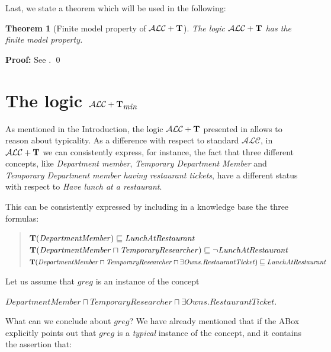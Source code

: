 \documentclass[a4paper, 11pt, oneside]{duthesis}
\newcommand{\tip}{{\bf T}}
\newcommand{\alc}{\mathcal{ALC}}
\newcommand{\alct}{\mathcal{ALC}+\tip}
\newcommand{\alctmin}{\mathcal{ALC}+\tip_{\mbox{\em min}}}
\newcommand{\nott} {\lnot}
\newcommand{\sqset}{\sqsubseteq}
\newcommand{\mint}{\sqcap}
\newenvironment{proof}
{\begin{trivlist} \item[] {\bf Proof:}}%
{\qed \end{trivlist}}
\newenvironment{proof}
{\begin{trivlist} \item[] {\bf Proof:}}%
{\qed \end{trivlist}}
\newtheorem{theorem}{Theorem}
\newcounter{posu}
\newtheorem{theorem}[posu]{Theorem}
\newtheorem{proof}[posu]{Proof}
\begin{document}
Last, we state a theorem which will be used in the following:

\begin{theorem}[Finite model property of $\alct$]\label{fmpALCT}
The logic $\alct$ has the finite model property.
\end{theorem}

\begin{proof}
See \cite{Giordano:2013:NDL:2435476.2435957}.
\end{proof}

\newpage

\section{The logic $\alctmin$}\label{alctmin}

As mentioned in the Introduction, the logic $\alct$ presented in \cite{FI09} allows  to reason about typicality.
As a difference with respect to standard $\alc$, in $\alct$ we can consistently express, for instance, the fact that three different concepts, like {\em Department member}, {\em Temporary Department Member} and {\em Temporary Department member having restaurant tickets}, have a different status with respect to {\em Have lunch at a restaurant}.

This can be consistently expressed by including in a knowledge base the three formulas:

\begin{quote}
$\tip (\mathit{DepartmentMember}) \sqset \mathit{LunchAtRestaurant}$\\
$\tip (\mathit{DepartmentMember} \mint \mathit{TemporaryResearcher})  \sqset \nott \mathit{LunchAtRestaurant}$\\
$\tip (\mathit{DepartmentMember} \mint \mathit{TemporaryResearcher} \mint \exists \mathit{Owns}.\mathit{RestaurantTicket}) \sqset \mathit{LunchAtRestaurant}$
\end{quote}

\noindent Let us assume that $\mathit{greg}$ is an instance of the concept
\begin{center}$\mathit{DepartmentMember} \sqcap \mathit{TemporaryResearcher} \sqcap \exists \mathit{Owns}.\mathit{RestaurantTicket}$. \end{center}
What can we conclude about $\mathit{\mathit{greg}}$? We have already mentioned that if the ABox explicitly points out that $\mathit{greg}$ is a {\em typical} instance of the  concept, and it contains the assertion that:
\end{document}
